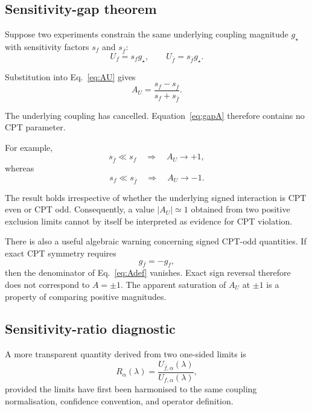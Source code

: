 \documentclass[aps,prd,reprint,superscriptaddress,nofootinbib]{revtex4-2}
\begin{document}
	\subsection{Sensitivity-gap theorem}
	
	Suppose two experiments constrain the same underlying coupling magnitude
	$g_\star$ with sensitivity factors $s_f$ and $s_{\bar f}$:
	\begin{equation}
		U_f=s_f g_\star,
		\qquad
		U_{\bar f}=s_{\bar f}g_\star .
		\label{eq:sensitivity}
	\end{equation}
	
	Substitution into Eq.~\eqref{eq:AU} gives
	\begin{equation}
		A_U
		=
		\frac{s_f-s_{\bar f}}
		{s_f+s_{\bar f}}.
		\label{eq:gapA}
	\end{equation}
	
	The underlying coupling has cancelled. Equation~\eqref{eq:gapA}
	therefore contains no CPT parameter.
	
	For example,
	\begin{equation}
		s_{\bar f}\ll s_f
		\quad\Longrightarrow\quad
		A_U\rightarrow +1,
	\end{equation}
	whereas
	\begin{equation}
		s_f\ll s_{\bar f}
		\quad\Longrightarrow\quad
		A_U\rightarrow -1.
	\end{equation}
	
	The result holds irrespective of whether the underlying signed
	interaction is CPT even or CPT odd. Consequently, a value
	$|A_U|\simeq1$ obtained from two positive exclusion limits cannot by
	itself be interpreted as evidence for CPT violation.
	
	There is also a useful algebraic warning concerning signed
	CPT-odd quantities. If exact CPT symmetry requires
	\begin{equation}
		g_{\bar f}=-g_f,
	\end{equation}
	then the denominator of Eq.~\eqref{eq:Adef} vanishes. Exact
	sign reversal therefore does not correspond to $A=\pm1$. The apparent
	saturation of $A_U$ at $\pm1$ is a property of comparing positive
	magnitudes.
	
	\subsection{Sensitivity-ratio diagnostic}
	
	A more transparent quantity derived from two one-sided limits is
	\begin{equation}
		R_\alpha(\lambda)
		=
		\frac{U_{\bar f,\alpha}(\lambda)}
		{U_{f,\alpha}(\lambda)},
		\label{eq:R}
	\end{equation}
	provided the limits have first been harmonised to the same coupling
	normalisation, confidence convention, and operator definition.
	
\end{document}
